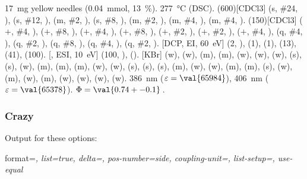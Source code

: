 \documentclass[load-preamble+]{cnltx-doc}
\begin{document}
\begin{experimental}[format=\bfseries,delta=(ppm),list=true,use-equal]
   \SI{17}{\milli\gram} yellow needles (\SI{0.04}{\milli\mole},
  \SI{13}{\percent}).
   \SI{277}{\celsius} (DSC).
  \NMR(600)[CDCl3]  (s, \#{24}, ),  (s, \#{12},
  ),  (m, \#{2}, ),  (s, \#{8},
  ),  (m, \#{2}, ),  (m, \#{4},
  ),  (m, \#{4}, ).
  (150)[CDCl3]  ($+$, \#{4}, ),  ($+$,
  \#{8}, ),  ($+$, \#{4}, ),  ($+$, \#{8},
  ),  ($+$, \#{2}, ),  ($+$, \#{2},
  ),  ($+$, \#{4}, ),  (q, \#{4},
  ),  (q, \#{2}, ),  (q, \#{8}, ),
   (q, \#{4}, ),  (q, \#{2}, ).
  [DCP, EI, \SI{60}{\electronvolt}]  (2, ), 
  (1),  (1),  (13),  (41),  (100).
  [, ESI, \SI{10}{\electronvolt}]  (100,
  ),  ().
  [KBr]  (w),  (w),  (m), 
  (m),  (w),  (w),  (w),  (s),
   (s),  (w),  (m),  (m), 
  (m),  (w),  (w),  (s),  (s),
   (s),  (m),  (w),  (w), 
  (m),  (m),  (s),  (w),  (m), 
  (w),  (m),  (w),  (w),  (w), 
  (w).
   \SI{386}{\nano\metre} ($\varepsilon = \val{65984}$),
  \SI{406}{\nano\metre} ($\varepsilon = \val{65378}$).
   $\Phi = \val{0.74+-0.1}$\,.
\end{experimental}

\subsubsection{Crazy}

Output for these options:
\begin{sourcecode}
  format=\color{red}\itshape,
  list=true,
  delta=\textcolor{green}{},
  pos-number=side,
  coupling-unit=\mega\gram\per\square\second,
  list-setup=,
  use-equal
\end{sourcecode}
\end{document}
